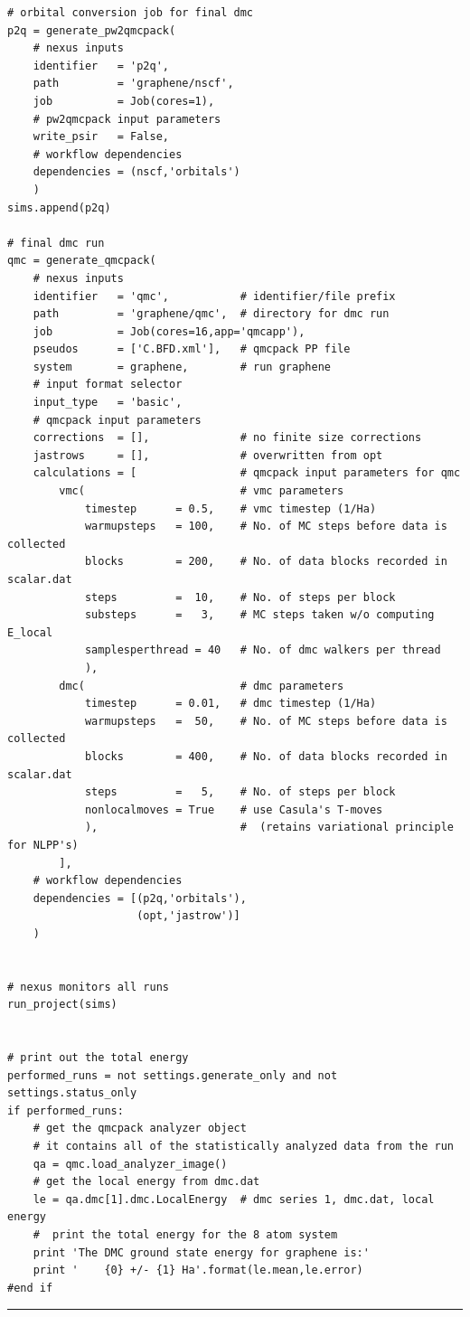 \documentclass[oneside,11pt]{memoir}
\numberwithin{equation}{section}
\newcommand{\HRule}{\rule{\linewidth}{0.5mm}}
\begin{document}
\begin{verbatim}
# orbital conversion job for final dmc
p2q = generate_pw2qmcpack(
    # nexus inputs
    identifier   = 'p2q',
    path         = 'graphene/nscf',
    job          = Job(cores=1),
    # pw2qmcpack input parameters
    write_psir   = False,
    # workflow dependencies
    dependencies = (nscf,'orbitals')
    )
sims.append(p2q)
    
# final dmc run
qmc = generate_qmcpack( 
    # nexus inputs
    identifier   = 'qmc',           # identifier/file prefix       
    path         = 'graphene/qmc',  # directory for dmc run       
    job          = Job(cores=16,app='qmcapp'),
    pseudos      = ['C.BFD.xml'],   # qmcpack PP file
    system       = graphene,        # run graphene
    # input format selector                                      
    input_type   = 'basic',
    # qmcpack input parameters
    corrections  = [],              # no finite size corrections
    jastrows     = [],              # overwritten from opt
    calculations = [                # qmcpack input parameters for qmc
        vmc(                        # vmc parameters 
            timestep      = 0.5,    # vmc timestep (1/Ha)
            warmupsteps   = 100,    # No. of MC steps before data is collected
            blocks        = 200,    # No. of data blocks recorded in scalar.dat
            steps         =  10,    # No. of steps per block
            substeps      =   3,    # MC steps taken w/o computing E_local
            samplesperthread = 40   # No. of dmc walkers per thread
            ),                      
        dmc(                        # dmc parameters
            timestep      = 0.01,   # dmc timestep (1/Ha)
            warmupsteps   =  50,    # No. of MC steps before data is collected
            blocks        = 400,    # No. of data blocks recorded in scalar.dat
            steps         =   5,    # No. of steps per block
            nonlocalmoves = True    # use Casula's T-moves
            ),                      #  (retains variational principle for NLPP's)
        ],
    # workflow dependencies
    dependencies = [(p2q,'orbitals'),
                    (opt,'jastrow')]
    )


# nexus monitors all runs
run_project(sims)


# print out the total energy
performed_runs = not settings.generate_only and not settings.status_only
if performed_runs:
    # get the qmcpack analyzer object
    # it contains all of the statistically analyzed data from the run
    qa = qmc.load_analyzer_image()
    # get the local energy from dmc.dat
    le = qa.dmc[1].dmc.LocalEnergy  # dmc series 1, dmc.dat, local energy
    #  print the total energy for the 8 atom system
    print 'The DMC ground state energy for graphene is:'
    print '    {0} +/- {1} Ha'.format(le.mean,le.error)
#end if
\end{verbatim}
\HRule
\end{document}
